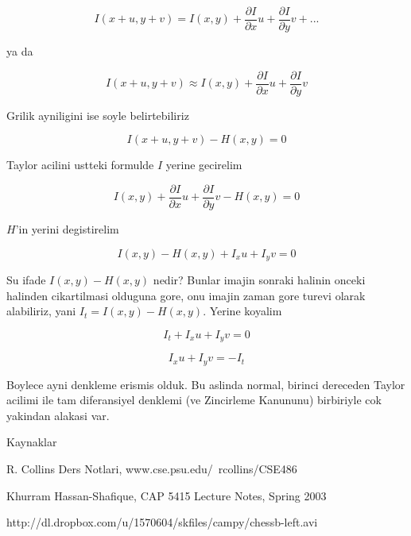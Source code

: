 \documentclass[12pt,fleqn]{article}
\begin{document}
\[ I(x+u,y+v) = I(x,y) + \frac{\partial I}{\partial x}u + 
\frac{\partial I}{\partial y}v + ...
\]

ya da

\[ I(x+u,y+v) \approx I(x,y) + \frac{\partial I}{\partial x}u + 
\frac{\partial I}{\partial y}v 
\]

Grilik ayniligini ise soyle belirtebiliriz

\[  I(x+u,y+v) - H(x,y) = 0\]

Taylor acilini ustteki formulde $I$ yerine gecirelim

\[ I(x,y) + 
\frac{\partial I}{\partial x}u + 
\frac{\partial I}{\partial y}v - H(x,y) = 0
\]

$H$'in yerini degistirelim

\[ I(x,y)  - H(x,y) + I_xu + I_yv = 0\]

Su ifade $I(x,y)  - H(x,y)$ nedir? Bunlar imajin sonraki halinin onceki 
halinden cikartilmasi olduguna gore, onu imajin zaman gore turevi 
olarak alabiliriz, yani $I_t = I(x,y) - H(x,y)$. Yerine koyalim

\[ I_t + I_xu + I_yv = 0\]

\[ I_xu + I_yv = -I_t \]

Boylece ayni denkleme erismis olduk. Bu aslinda normal, birinci
dereceden Taylor acilimi ile tam diferansiyel denklemi (ve Zincirleme
Kanununu) birbiriyle cok yakindan alakasi var. 

Kaynaklar

R. Collins Ders Notlari, www.cse.psu.edu/~rcollins/CSE486

Khurram Hassan-Shafique, CAP 5415 Lecture Notes, Spring 2003

http://dl.dropbox.com/u/1570604/skfiles/campy/chessb-left.avi
\end{document}
